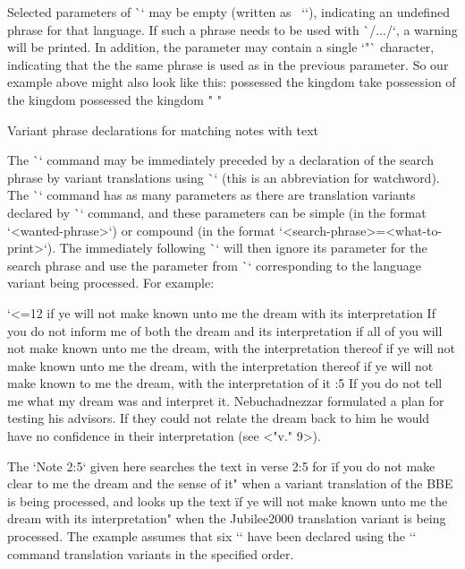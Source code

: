 Selected parameters of \`\vdef` may be empty (written as ~`{}`),
indicating an undefined phrase for that language.
If such a phrase needs to be used with \`\x/.../`, a warning will be printed.
In addition, the parameter may contain a single `"` character, indicating that the
the same phrase is used as in the previous parameter. So our
example above might also look like this:
\begtt
{} %
      {possessed the kingdom} %
      {take possession of the kingdom} %
      {possessed the kingdom} %
      {"} %
      {"} %
\endtt



\secc[ww] Variant phrase declarations for matching notes with text

The \`\Note` command may be immediately preceded by a declaration of the search
phrase by variant translations using \`\ww` (this is an abbreviation for watchword).
The \`\ww` command has as many parameters as there are translation variants declared by
\`\variants` command, and these parameters can be simple (in the format
`{<wanted-phrase>}`) or compound (in the format
`{<search-phrase>}={<what-to-print>}`). The immediately following \`\Note`
will then ignore its parameter for the search phrase and use the parameter from \`\ww`
corresponding to the language variant being processed. For example:

\begtt \typosize[8/11] \catcode`<=12
    {if ye will not make known unto me the dream with its interpretation} %
    {If you do not inform me of both the dream and its interpretation} %
    {if all of you will not make known unto me the dream, with the interpretation thereof} %
    {if ye will not make known unto me the dream, with the interpretation thereof} %
    {if ye will not make known to me the dream, with the interpretation of it} %
:5 {If you do not tell me what my dream was and interpret it.}
    Nebuchadnezzar formulated a plan for testing his advisors. If they could not relate the dream back 
    to him he would have no confidence in their interpretation (see <"v." 9>). 
\endtt

The `Note 2:5` given here searches the text in verse 2:5 for \"if you do not make clear to me the 
dream and the sense of it" when a variant translation of the BBE is being processed, and looks up 
the text \"if ye will not make known unto me the dream with its interpretation" when the Jubilee2000 
translation variant is being processed.
The example assumes that six `\variants` have been declared using the `\variants` command
translation variants in the specified order. 

